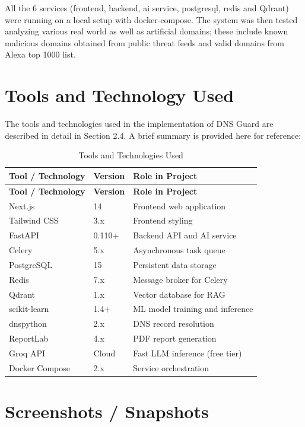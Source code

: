 \documentclass[12pt, a4paper, oneside]{report}
\begin{document}
All the 6 services (frontend, backend, ai service, postgresql, redis and Qdrant) were running on a local setup with docker-compose. The system was then tested analyzing various real world as well as artificial domains; these include known malicious domains obtained from public threat feeds and valid domains from Alexa top 1000 list.

\section{Tools and Technology Used}

The tools and technologies used in the implementation of DNS Guard are described in detail in Section 2.4. A brief summary is provided here for reference:

\begin{longtable}{|p{4cm}|p{3cm}|p{7cm}|}
\caption{Tools and Technologies Used}\\
\hline
\rowcolor{nfsuBlue!15}
\textbf{Tool / Technology} & \textbf{Version} & \textbf{Role in Project} \\
\hline
\endfirsthead
\hline
\rowcolor{nfsuBlue!15}
\textbf{Tool / Technology} & \textbf{Version} & \textbf{Role in Project} \\
\hline
\endhead
\hline
\endfoot
Next.js & 14 & Frontend web application \\
\hline
Tailwind CSS & 3.x & Frontend styling \\
\hline
FastAPI & 0.110+ & Backend API and AI service \\
\hline
Celery & 5.x & Asynchronous task queue \\
\hline
PostgreSQL & 15 & Persistent data storage \\
\hline
Redis & 7.x & Message broker for Celery \\
\hline
Qdrant & 1.x & Vector database for RAG \\
\hline
scikit-learn & 1.4+ & ML model training and inference \\
\hline
dnspython & 2.x & DNS record resolution \\
\hline
ReportLab & 4.x & PDF report generation \\
\hline
Groq API & Cloud & Fast LLM inference (free tier) \\
\hline
Docker Compose & 2.x & Service orchestration \\
\hline
\end{longtable}

\section{Screenshots / Snapshots}
\end{document}
